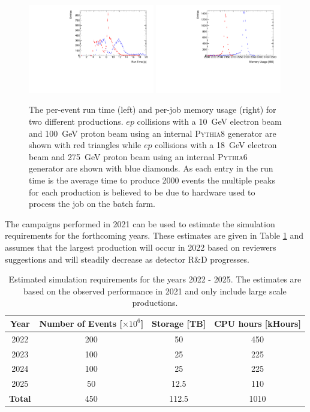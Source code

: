 	\begin{figure}[!htbp]
		\begin{center}
			\includegraphics[width=0.49\textwidth]{figs/simulation_runTime.pdf}
			\includegraphics[width=0.49\textwidth]{figs/simulation_memory.pdf}
		\end{center}
		\caption{\small The per-event run time (left) and per-job memory usage (right) for two different productions. $ep$ collisions with a 10~GeV electron beam and 100~GeV proton beam using an internal \textsc{Pythia8} generator are shown with red triangles while $ep$ collisions with a 18~GeV electron beam and 275~GeV proton beam using an internal \textsc{Pythia6} generator are shown with  blue diamonds.  As each entry in the run time is the average time to produce 2000 events the multiple peaks for each production is believed to be due to hardware used to process the job on the batch farm.}\label{fig:sim_jobs}
	\end{figure}

The campaigns performed in 2021 can be used to estimate the simulation requirements for the forthcoming years. These estimates are given in Table \ref{tab:sim_predictions} and assumes that the largest production will occur in 2022 based on reviewers suggestions and will steadily decrease as detector R$\&$D progresses.

\begin{table}[!htbp]
	\centering
	\begin{tabular}{c|c|c|c}
		\hline
		Year & Number of Events [$\times 10^{6}$] & Storage [TB] & CPU hours [kHours] \\
		\hline
		\hline
		2022 & 200 & 50 & 450\\
		2023 & 100 & 25 & 225 \\
		2024 & 100 & 25 & 225 \\
		2025 & 50 & 12.5 & 110 \\
		\hline
		\hline
		\textbf{Total} & 450 & 112.5 & 1010 \\
		\hline
	\end{tabular}
	\caption[]{Estimated simulation requirements for the years 2022 - 2025. The estimates are based on the observed performance in 2021 and only include large scale productions.}
	\label{tab:sim_predictions}
\end{table}